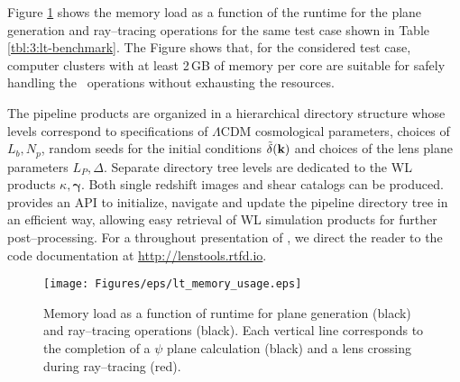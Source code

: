 %
Figure \ref{fig:3:lt-memory} shows the memory load as a function of the runtime for the plane generation and ray--tracing operations for the same test case shown in Table \ref{tbl:3:lt-benchmark}. The Figure shows that, for the considered test case, computer clusters with at least 2\,GB of memory per core are suitable for safely handling the \LT\, operations without exhausting the resources. 

The pipeline products are organized in a hierarchical directory structure whose levels correspond to specifications of $\Lambda$CDM cosmological parameters, choices of $L_b,N_p$, random seeds for the initial conditions $\tilde{\delta}(\mathbf{k})$ and choices of the lens plane parameters $L_P,\Delta$. Separate directory tree levels are dedicated to the WL products $\kappa,\pmb{\gamma}$. Both single redshift images and shear catalogs can be produced. \LT\, provides an API to initialize, navigate and update the pipeline directory tree in an efficient way, allowing easy retrieval of WL simulation products for further post--processing. For a throughout presentation of \LT, we direct the reader to the code documentation at \url{http://lenstools.rtfd.io}. 
\begin{figure}
\begin{center}
\texttt{[image: Figures/eps/lt\_memory\_usage.eps]}
\end{center}
\caption{Memory load as a function of runtime for plane generation (black) and ray--tracing operations (black). Each vertical line corresponds to the completion of a $\psi$ plane calculation (black) and a lens crossing during ray--tracing (red).}
\label{fig:3:lt-memory}
\end{figure}
    

